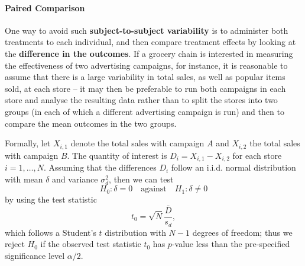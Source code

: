 \paragraph{Paired Comparison}
One way to avoid such \textbf{subject-to-subject variability} is to administer both treatments to each individual,  and then compare treatment effects by looking at the \textbf{difference in the outcomes}. If a grocery chain is interested in measuring the effectiveness of two advertising campaigns, for instance, it is reasonable to assume that there is a large variability in total sales, as well as popular items sold, at each store -- it may then be preferable to run both campaigns in each store and analyse the resulting data rather than to split the stores into two groups (in each of which a different advertising campaign is run) and then to compare the mean outcomes in the two groups. 

Formally, let $X_{i,1}$ denote the total sales with campaign $A$ and $X_{i,2}$ the total sales with campaign $B$. The quantity of interest is $D_{i}=X_{i,1}-X_{i,2}$ for each store $i=1,\ldots,N$. Assuming that the differences $D_{i}$ follow an {i.i.d.} normal distribution with mean $\delta$ and variance $\sigma^{2}_{d}$, then we can test $$H_{0}: \delta=0\quad\mbox{against}\quad H_{1}: \delta \neq 0$$ by using the test statistic $$t_0=\sqrt{N}\frac{\bar{D}}{s_{d}},$$ which follows a Student's $t$ distribution with  $N-1$ degrees of freedom; thus we reject $H_{0}$ if the observed test statistic $t_{0}$ has $p$-value less than the pre-specified significance level $\alpha/2$.

